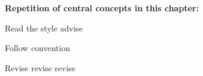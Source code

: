 \documentclass{tufte-book}
\begin{document}



\vspace{1cm}
\begin{mdframed}
    
\textbf{Repetition of central concepts in this chapter:} 

\begin{itemize*}
  \item Read the style advise
  \item Follow convention
  \item Revise revise revise
\end{itemize*}

\end{mdframed}




\end{document}
